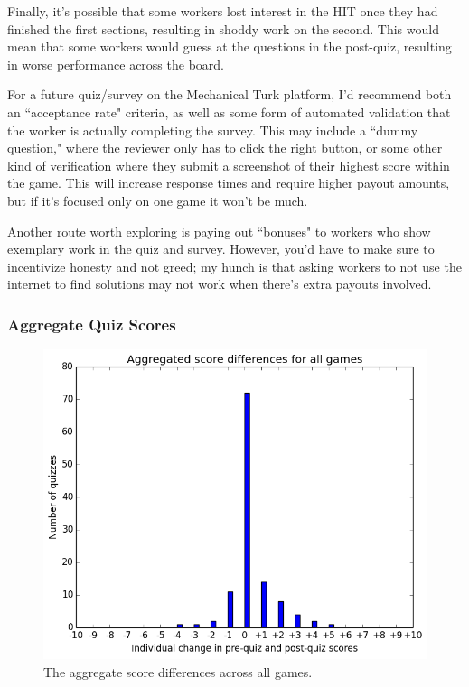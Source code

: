 			Finally, it's possible that some workers lost interest in the HIT once they had finished the first sections, resulting in shoddy work on the second. This would mean that some workers would guess at the questions in the post-quiz, resulting in worse performance across the board.

			For a future quiz/survey on the Mechanical Turk platform, I'd recommend both an ``acceptance rate" criteria, as well as some form of automated validation that the worker is actually completing the survey. This may include a ``dummy question," where the reviewer only has to click the right button, or some other kind of verification where they submit a screenshot of their highest score within the game. This will increase response times and require higher payout amounts, but if it's focused only on one game it won't be much.

			Another route worth exploring is paying out ``bonuses" to workers who show exemplary work in the quiz and survey. However, you'd have to make sure to incentivize honesty and not greed; my hunch is that asking workers to not use the internet to find solutions may not work when there's extra payouts involved.

\cleardoublepage

		\subsubsection{Aggregate Quiz Scores}


			\begin{figure}[h!] 
			\centering 
			\includegraphics[height=0.33\textheight]{general_results.png} 
			\caption{The aggregate score differences across all games.}
			\end{figure}

